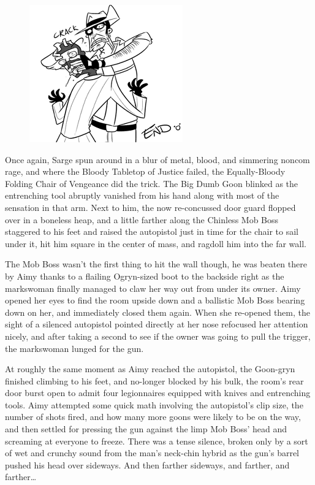 \begin{figure}
	\begin{center}
		\includegraphics[width=\figwidth]{pics/21/50.png}
	\end{center}
\end{figure}
Once again, Sarge spun around in a blur of metal, blood, and simmering noncom rage, and where the Bloody Tabletop of Justice failed, the Equally-Bloody Folding Chair of Vengeance did the trick. 
The Big Dumb Goon blinked as the entrenching tool abruptly vanished from his hand along with most of the sensation in that arm. 
Next to him, the now re-concussed door guard flopped over in a boneless heap, and a little farther along the Chinless Mob Boss staggered to his feet and raised the autopistol just in time for the chair to sail under it, hit him square in the center of mass, and ragdoll him into the far wall.

The Mob Boss wasn't the first thing to hit the wall though, he was beaten there by Aimy thanks to a flailing Ogryn-sized boot to the backside right as the markswoman finally managed to claw her way out from under its owner. 
Aimy opened her eyes to find the room upside down and a ballistic Mob Boss bearing down on her, and immediately closed them again. 
When she re-opened them, the sight of a silenced autopistol pointed directly at her nose refocused her attention nicely, and after taking a second to see if the owner was going to pull the trigger, the markswoman lunged for the gun. 


At roughly the same moment as Aimy reached the autopistol, the Goon-gryn finished climbing to his feet, and no-longer blocked by his bulk, the room's rear door burst open to admit four legionnaires equipped with knives and entrenching tools. 
Aimy attempted some quick math involving the autopistol's clip size, the number of shots fired, and how many more goons were likely to be on the way, and then settled for pressing the gun against the limp Mob Boss' head and screaming at everyone to freeze. 
There was a tense silence, broken only by a sort of wet and crunchy sound from the man's neck-chin hybrid as the gun's barrel pushed his head over sideways. 
And then farther sideways, and farther, and farther… 

